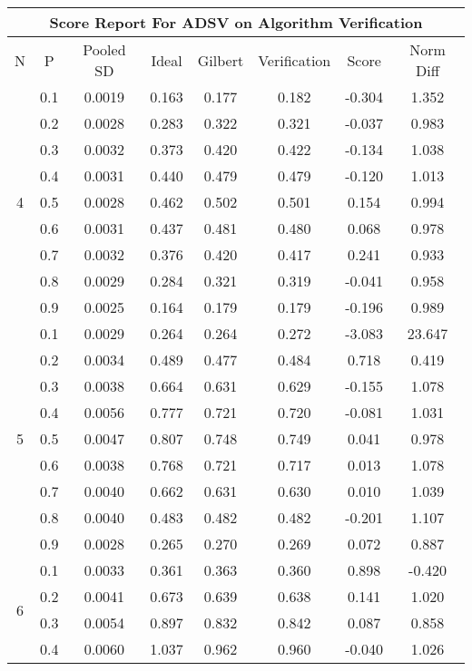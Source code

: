 \documentclass[11pt,a4paper]{report}
\begin{document}
\begin{longtable}{ | c | c || c | c | c | c | c | c | }
\hline
\multicolumn{8}{|c|}{ Score Report For ADSV on Algorithm Verification} \\
\hline
N & P & Pooled SD &  Ideal &  Gilbert & Verification  & Score & Norm Diff \\
 \hline
 \hline
 \endhead
\multirow{9}{*}{4} & 0.1 & 0.0019 & 0.163 & 0.177 & 0.182 & -0.304 & 1.352 \\
 & 0.2 & 0.0028 & 0.283 & 0.322 & 0.321 & -0.037 & 0.983 \\
 & 0.3 & 0.0032 & 0.373 & 0.420 & 0.422 & -0.134 & 1.038 \\
 & 0.4 & 0.0031 & 0.440 & 0.479 & 0.479 & -0.120 & 1.013 \\
 & 0.5 & 0.0028 & 0.462 & 0.502 & 0.501 & 0.154 & 0.994 \\
 & 0.6 & 0.0031 & 0.437 & 0.481 & 0.480 & 0.068 & 0.978 \\
 & 0.7 & 0.0032 & 0.376 & 0.420 & 0.417 & 0.241 & 0.933 \\
 & 0.8 & 0.0029 & 0.284 & 0.321 & 0.319 & -0.041 & 0.958 \\
 & 0.9 & 0.0025 & 0.164 & 0.179 & 0.179 & -0.196 & 0.989 \\
 \hline
\multirow{9}{*}{5} & 0.1 & 0.0029 & 0.264 & 0.264 & 0.272 & -3.083 & 23.647 \\
 & 0.2 & 0.0034 & 0.489 & 0.477 & 0.484 & 0.718 & 0.419 \\
 & 0.3 & 0.0038 & 0.664 & 0.631 & 0.629 & -0.155 & 1.078 \\
 & 0.4 & 0.0056 & 0.777 & 0.721 & 0.720 & -0.081 & 1.031 \\
 & 0.5 & 0.0047 & 0.807 & 0.748 & 0.749 & 0.041 & 0.978 \\
 & 0.6 & 0.0038 & 0.768 & 0.721 & 0.717 & 0.013 & 1.078 \\
 & 0.7 & 0.0040 & 0.662 & 0.631 & 0.630 & 0.010 & 1.039 \\
 & 0.8 & 0.0040 & 0.483 & 0.482 & 0.482 & -0.201 & 1.107 \\
 & 0.9 & 0.0028 & 0.265 & 0.270 & 0.269 & 0.072 & 0.887 \\
 \hline
\multirow{9}{*}{6} & 0.1 & 0.0033 & 0.361 & 0.363 & 0.360 & 0.898 & -0.420 \\
 & 0.2 & 0.0041 & 0.673 & 0.639 & 0.638 & 0.141 & 1.020 \\
 & 0.3 & 0.0054 & 0.897 & 0.832 & 0.842 & 0.087 & 0.858 \\
 & 0.4 & 0.0060 & 1.037 & 0.962 & 0.960 & -0.040 & 1.026 \\

\end{longtable}
\end{document}
